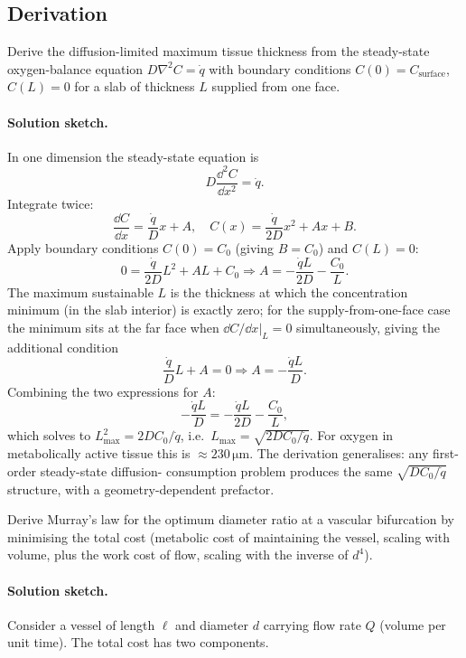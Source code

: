 \subsection*{Derivation}

\begin{exercise}
Derive the diffusion-limited maximum tissue thickness from the
steady-state oxygen-balance equation
$D \nabla^2 C = \dot{q}$ with boundary conditions
$C(0) = C_{\text{surface}}$, $C(L) = 0$ for a slab of thickness $L$
supplied from one face.
\end{exercise}

\paragraph{Solution sketch.} In one dimension the steady-state
equation is
\[
D \frac{\dd^2 C}{\dd x^2} = \dot{q}.
\]
Integrate twice:
\[
\frac{\dd C}{\dd x} = \frac{\dot{q}}{D} x + A, \quad
C(x) = \frac{\dot{q}}{2D} x^2 + A x + B.
\]
Apply boundary conditions $C(0) = C_0$ (giving $B = C_0$) and
$C(L) = 0$:
\[
0 = \frac{\dot{q}}{2D} L^2 + A L + C_0
\Rightarrow A = -\frac{\dot{q} L}{2 D} - \frac{C_0}{L}.
\]
The maximum sustainable $L$ is the thickness at which the
concentration minimum (in the slab interior) is exactly zero; for
the supply-from-one-face case the minimum sits at the far face when
$\dd C/\dd x |_{L} = 0$ simultaneously, giving the additional
condition
\[
\frac{\dot{q}}{D} L + A = 0 \Rightarrow A = -\frac{\dot{q} L}{D}.
\]
Combining the two expressions for $A$:
\[
-\frac{\dot{q} L}{D} = -\frac{\dot{q} L}{2 D} - \frac{C_0}{L},
\]
which solves to $L_{\max}^2 = 2 D C_0 / \dot{q}$, i.e.\
$L_{\max} = \sqrt{2 D C_0 / \dot{q}}$. For oxygen in metabolically
active tissue this is $\approx 230\,\si{\micro\meter}$. The
derivation generalises: any first-order steady-state diffusion-
consumption problem produces the same $\sqrt{D C_0 / \dot{q}}$
structure, with a geometry-dependent prefactor.

\begin{exercise}
Derive Murray's law for the optimum diameter ratio at a vascular
bifurcation by minimising the total cost (metabolic cost of
maintaining the vessel, scaling with volume, plus the work cost of
flow, scaling with the inverse of $d^4$).
\end{exercise}

\paragraph{Solution sketch.} Consider a vessel of length $\ell$ and
diameter $d$ carrying flow rate $Q$ (volume per unit time). The
total cost has two components.

